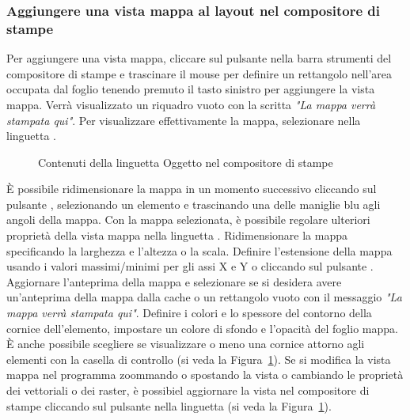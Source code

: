 \subsubsection{Aggiungere una vista mappa al layout nel compositore di
stampe}

Per aggiungere una vista mappa, cliccare sul pulsante
 nella barra strumenti
del compositore di stampe e trascinare il mouse per definire un rettangolo
nell'area occupata dal foglio tenendo premuto il tasto sinistro per aggiungere
la vista mappa. Verrà visualizzato un riquadro vuoto con la scritta
\textit{"La mappa verrà stampata qui"}. Per visualizzare effettivamente la mappa,
selezionare  nella linguetta .

\begin{figure}[ht]
\centering
\caption{Contenuti della linguetta Oggetto nel compositore di stampe \nixcaption}\label{fig:print_composer_map_item}
   \goodgap
\end{figure}

È possibile ridimensionare la mappa in un momento successivo cliccando sul
pulsante , selezionando
un elemento e trascinando una delle maniglie blu agli angoli della mappa. Con
la mappa selezionata, è possibile regolare ulteriori proprietà della vista
mappa nella linguetta . Ridimensionare la mappa specificando la
larghezza e l'altezza o la scala. Definire l'estensione della mappa usando i
valori massimi/minimi per gli assi X e Y o cliccando sul pulsante
. Aggiornare l'anteprima della
mappa e selezionare se si desidera avere un'anteprima della mappa dalla cache
o un rettangolo vuoto con il messaggio \textit{"La mappa verrà stampata qui"}.
Definire i colori e lo spessore del contorno della cornice dell'elemento,
impostare un colore di sfondo e l'opacità del foglio mappa. È anche possibile
scegliere se visualizzare o meno una cornice attorno agli elementi con la
casella di controllo  (si veda la
Figura~\ref{fig:print_composer_map_item}). Se si modifica la vista mappa nel
programma zoommando o spostando la vista o cambiando le proprietà dei
vettoriali o dei raster, è possibiel aggiornare la vista nel compositore di
stampe cliccando sul pulsante  nella linguetta
 (si veda la Figura~\ref{fig:print_composer_map_item}). 

